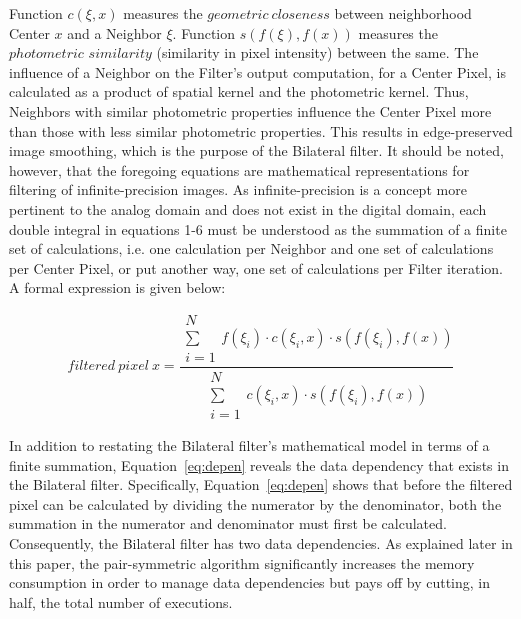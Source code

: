 \documentclass{IEEEtran}
\begin{document}
Function $c(\xi,x)$ measures the $geometric~closeness$ between neighborhood Center $x$ and a Neighbor $\xi$. Function $s(f(\xi),f(x))$ measures the $photometric$ $similarity$ (similarity in pixel intensity) between the same. The influence of a Neighbor on the Filter's output computation, for a Center Pixel, is calculated as a product of spatial kernel and the photometric kernel. Thus, Neighbors with similar photometric properties influence the Center Pixel more than those with less similar photometric properties. This results in edge-preserved image smoothing, which is the purpose of the Bilateral filter. It should be noted, however, that the foregoing equations are mathematical representations for filtering of infinite-precision images. As infinite-precision is a concept more pertinent to the analog domain and does not exist in the digital domain, each double integral in equations 1-6 must be understood as the summation of a finite set of calculations, i.e. one calculation per Neighbor and one set of calculations per Center Pixel, or put another way, one set of calculations per Filter iteration. A formal expression is given below:

\begin{equation}
\label{eq:depen}
filtered\: pixel\: x=\frac{\substack{N\\
\sum\\
i=1
}
f(\xi_{i})\cdot c(\xi_{i},x)\cdot s(f(\xi_{i}),f(x))}{\substack{N\\
\sum\\
i=1
}
c(\xi_{i},x)\cdot s(f(\xi_{i}),f(x))}
\end{equation}

In addition to restating the Bilateral filter's mathematical model in terms of a finite summation, Equation~\ref{eq:depen} reveals the data dependency that exists in the Bilateral filter. Specifically, Equation~\ref{eq:depen} shows that before the filtered pixel can be calculated by dividing the numerator by the denominator, both the summation in the numerator and denominator must first be calculated. Consequently, the Bilateral filter has two data dependencies. As explained later in this paper, the pair-symmetric algorithm significantly increases the memory consumption in order to manage data dependencies but pays off by cutting, in half, the total number of executions.
\end{document}
